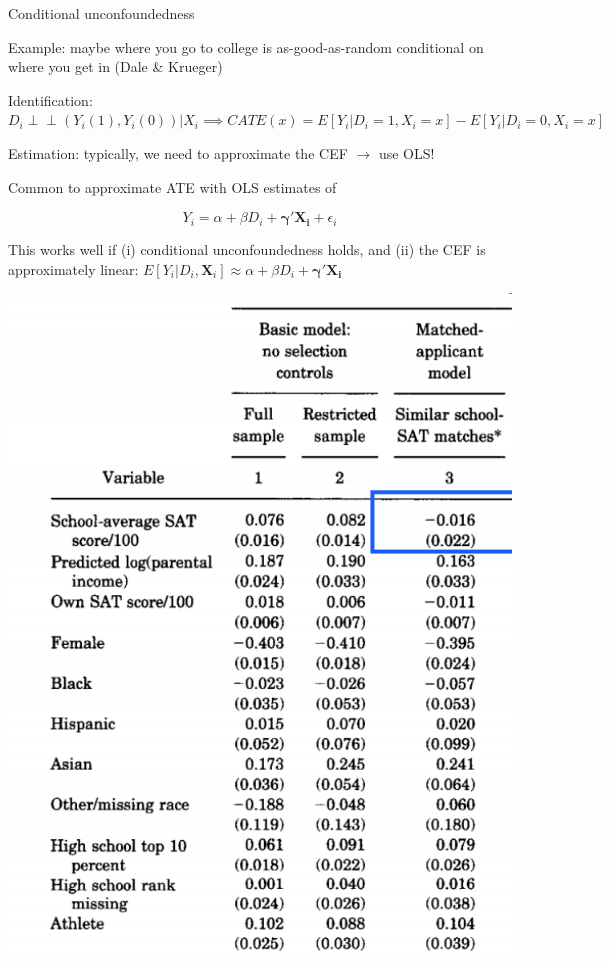\documentclass[11pt,english,handout]{beamer}
\newenvironment{wideitemize}{\itemize\addtolength{\itemsep}{10pt}}{\enditemize}
\newcommand{\indep}{\perp\!\!\!\!\perp}
\begin{document}
\begin{frame}{Conditional unconfoundedness}
	\begin{wideitemize}
		\item
		Example: maybe where you go to college is as-good-as-random conditional on where you get in (Dale \& Krueger)
		
		\pause
		\item
		Identification: $D_i \indep (Y_i(1),Y_i(0)) | X_i  \implies CATE(x) = E[Y_i | D_i =1 , X_i = x] - E[Y_i | D_i = 0, X_i = x]$ 
		
		\pause
		\item
		Estimation: typically, we need to approximate the CEF $\rightarrow$ use OLS!
		
		\item
		Common to approximate ATE with OLS estimates of 
		
		$$Y_i = \alpha + \beta D_i + \bm{\gamma}' \bm{X_i} + \epsilon_i$$
		
		\pause
		\item
		This works well if (i) conditional unconfoundedness holds, and (ii) the CEF is approximately linear: $E[Y_i | D_i, \bm{X}_i] \approx \alpha + \beta D_i + \bm{\gamma}' \bm{X_i} $
	\end{wideitemize}	
\end{frame}

\begin{frame}
	\includegraphics[width = 0.4\linewidth]{dk-results-table-reg2}
\end{frame}
\end{document}
